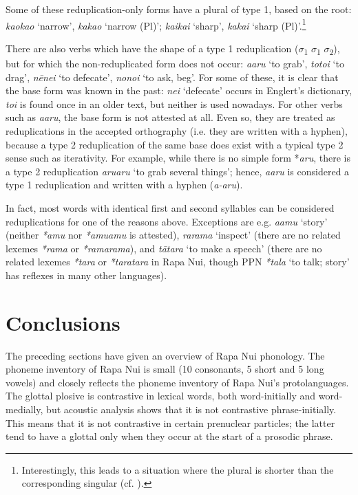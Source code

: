 Some of these reduplication-only forms have a plural of type 1, based on the root: \textit{kaokao} ‘narrow’, \textit{kakao} ‘narrow (Pl)’; \textit{ka{\ꞌ}ika{\ꞌ}i} ‘sharp’, \textit{kaka{\ꞌ}i} ‘sharp (Pl)’.\footnote{\label{fn:85}Interestingly, this leads to a situation where the plural is shorter than the corresponding singular (cf. \citealt[40]{Blust2001}).}

There are also verbs which have the shape of a type 1 reduplication ($\sigma $\textsubscript{1} $\sigma $\textsubscript{1} $\sigma $\textsubscript{2}), but for which the non-reduplicated form does not occur: \textit{{\ꞌ}a{\ꞌ}aru} ‘to grab’, \textit{totoi} ‘to drag’, \textit{nēne{\ꞌ}i} ‘to defecate’, \textit{nono{\ꞌ}i} ‘to ask, beg’. For some of these, it is clear that the base form was known in the past: \textit{ne{\ꞌ}i} ‘defecate’ occurs in Englert’s dictionary, \textit{toi} is found once in an older text, but neither is used nowadays. For other verbs such as \textit{{\ꞌ}a{\ꞌ}aru}, the base form is not attested at all. Even so, they are treated as reduplications in the accepted orthography (i.e. they are written with a hyphen), because a type 2 reduplication of the same base does exist with a typical type 2 sense such as iterativity. For example, while there is no simple form *\textit{{\ꞌ}aru}, there is a type 2 reduplication \textit{{\ꞌ}aru{\ꞌ}aru} ‘to grab several things’; hence, \textit{{\ꞌ}a{\ꞌ}aru} is considered a type 1 reduplication and written with a hyphen (\textit{{\ꞌ}a\nobreakdash-{\ꞌ}aru}). 

In fact, most words with identical first and second syllables can be considered reduplications for one of the reasons above. Exceptions are e.g. \textit{{\ꞌ}a{\ꞌ}amu} ‘story’ (neither \textit{*{\ꞌ}amu} nor \textit{*{\ꞌ}amu{\ꞌ}amu} is attested), \textit{rarama} ‘inspect’ (there are no related lexemes \textit{*rama} or \textit{*rama\-rama}), and \textit{tātara} ‘to make a speech’ (there are no related lexemes \textit{*tara} or \textit{*taratara} in Rapa Nui, though PPN \textit{*tala} ‘to talk; story’ has reflexes in many other languages).
\section{Conclusions}\label{sec:2.7}

The preceding sections have given an overview of Rapa Nui phonology. The phoneme inventory of Rapa Nui is small (10 consonants, 5 short and 5 long vowels) and closely reflects the phoneme inventory of Rapa Nui’s protolanguages. The glottal plosive is contrastive in lexical words, both word-initially and word-medially, but acoustic analysis shows that it is not contrastive phrase-initially. This means that it is not contrastive in certain prenuclear particles; the latter tend to have a glottal only when they occur at the start of a prosodic phrase.

